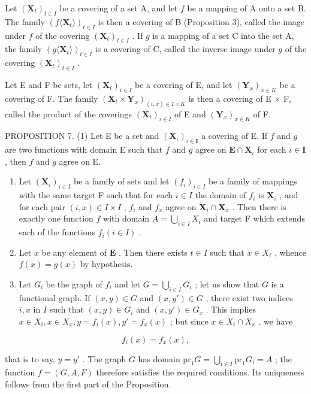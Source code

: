 Let \((\mathbf{X}_t)_{t\in I}\) be a covering of a set A, and let \(f\) be a mapping of A onto a set B. The family \((f\langle \mathbf{X}_t\rangle)_{t\in I}\) is then a covering of B (Proposition 3), called the image under \(f\) of the covering \((\mathbf{X}_t)_{t\in I}\) . If \(g\) is a mapping of a set C into the set A, the family \((\overline{g}\langle \mathbf{X}_t\rangle)_{t\in I}\) is a covering of C, called the inverse image under \(g\) of the covering \((\mathbf{X}_t)_{t\in I}\) .

Let E and F be sets, let \((\mathbf{X}_t)_{i \in I}\) be a covering of E, and let \((\mathbf{Y}_x)_{x \in K}\) be a covering of F. The family \((\mathbf{X}_t \times \mathbf{Y}_x)_{(i,x) \in I \times K}\) is then a covering of E × F, called the product of the coverings \((\mathbf{X}_t)_{i \in I}\) of E and \((\mathbf{Y}_x)_{x \in K}\) of F.

PROPOSITION 7. (1) Let E be a set and \((\mathbf{X}_{\iota})_{\iota \in \mathbf{I}}\) a covering of E. If \(f\) and \(g\) are two functions with domain E such that \(f\) and \(g\) agree on \(\mathbf{E} \cap \mathbf{X}_{\iota}\) for each \(\iota \in \mathbf{I}\) , then \(f\) and \(g\) agree on E.

\begin{enumerate}
\def\labelenumi{(\arabic{enumi})}
\setcounter{enumi}{1}
\item
  Let \((\mathbf{X}_i)_{i \in I}\) be a family of sets and let \((f_i)_{i \in I}\) be a family of mappings with the same target F such that for each \(i \in I\) the domain of \(f_i\) is \(\mathbf{X}_i\) , and for each pair \((i, x) \in I \times I\) , \(f_i\) and \(f_x\) agree on \(\mathbf{X}_i \cap \mathbf{X}_x\) . Then there is exactly one function \(f\) with domain \(A = \bigcup_{i \in I} X_i\) and target F which extends each of the functions \(f_i (i \in I)\) .
\item
  Let \(x\) be any element of \(\mathbf{E}\) . Then there exists \(t \in I\) such that \(x \in X_t\) , whence \(f(x) = g(x)\) by hypothesis.
\item
  Let \(G_{i}\) be the graph of \(f_{i}\) and let \(G = \bigcup_{i \in I} G_{i}\) ; let us show that \(G\) is a functional graph. If \((x, y) \in G\) and \((x, y') \in G\) , there exist two indices \(i, x\) in \(I\) such that \((x, y) \in G_{i}\) and \((x, y') \in G_{x}\) . This implies \(x \in X_{i}, x \in X_{x}, y = f_{i}(x), y' = f_{x}(x)\) ; but since \(x \in X_{i} \cap X_{x}\) , we have
\end{enumerate}

\[
f _ {i} (x) = f _ {x} (x),
\]

that is to say, \(y = y'\) . The graph \(G\) has domain \(\mathrm{pr}_1 G = \bigcup_{i \in I} \mathrm{pr}_1 G_i = A\) ; the function \(f = (G, A, F)\) therefore satisfies the required conditions. Its uniqueness follows from the first part of the Proposition.

